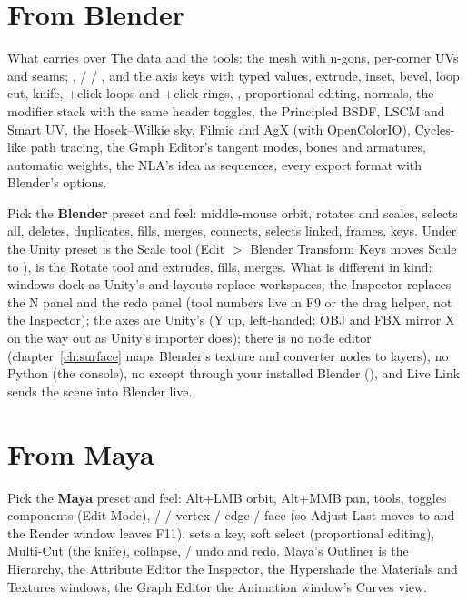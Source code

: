 \section{From Blender}
\begin{fromnote}{What carries over}
The data and the tools: the mesh with n-gons, per-corner UVs and seams; ,  /  / ,  and
the axis keys with typed values,  extrude,  inset,  bevel,  loop cut,  knife,
+click loops and +click rings, ,  proportional editing,  normals, the
modifier stack with the same header toggles, the Principled BSDF, LSCM and Smart UV, the Hosek--Wilkie sky, Filmic and
AgX (with OpenColorIO), Cycles-like path tracing, the Graph Editor's tangent modes, bones and armatures, automatic
weights, the NLA's idea as sequences, every export format with Blender's options.
\end{fromnote}
Pick the \textbf{Blender} preset and feel: middle-mouse orbit,  rotates and  scales,  selects all,
 deletes,  duplicates,  fills,  merges,  connects,  selects linked,
 frames,  keys. Under the Unity preset  is the Scale tool (Edit $>$ Blender Transform Keys
moves Scale to ),  is the Rotate tool and  extrudes,  fills,  merges.
What is different in kind: windows dock as Unity's and layouts replace workspaces; the Inspector replaces the N panel
and the redo panel (tool numbers live in F9 or the drag helper, not the Inspector); the axes are Unity's (Y up,
left-handed: OBJ and FBX mirror X on the way out as Unity's importer does); there is no node editor (chapter~\ref{ch:surface}
maps Blender's texture and converter nodes to layers), no Python (the console), no  except through your
installed Blender (), and Live Link sends the scene into Blender live.

\section{From Maya}
Pick the \textbf{Maya} preset and feel: Alt+LMB orbit, Alt+MMB pan,  tools,  toggles components
(Edit Mode),  /  /  vertex / edge / face (so Adjust Last moves to  and the Render
window leaves F11),  sets a key,  soft select (proportional editing),  Multi-Cut (the
knife),  collapse,  /  undo and redo. Maya's Outliner is the Hierarchy, the Attribute
Editor the Inspector, the Hypershade the Materials and Textures windows, the Graph Editor the Animation window's Curves
view.


